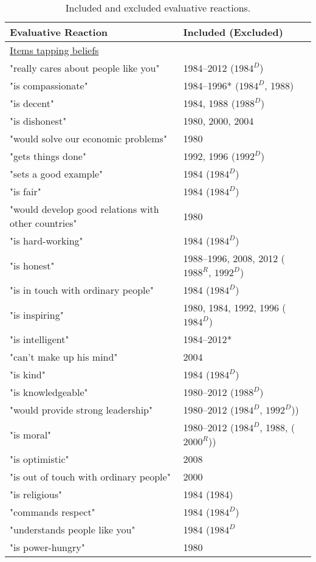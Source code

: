 \documentclass[10pt]{article}
\begin{document}
\begin{table}[t]
\begin{threeparttable}
    \caption{Included and excluded evaluative reactions.}
    \label{tab:tab2}
   \begin{tabular}{ll}
        \toprule
        Evaluative Reaction &	Included (Excluded)\\
        \midrule
        \multicolumn{2}{l}{\underline{Items tapping beliefs}}\\       
"really cares about people like you" &	1984--2012 ($1984^{D}$)\\
"is compassionate" &	1984--1996* ($1984^{D}$, 1988)\\
"is decent" &	1984, 1988 ($1988^{D}$)\\
"is dishonest" &	1980, 2000, 2004\\
"would solve our economic problems" &	1980\\
"gets things done" &	1992, 1996 ($1992^{D}$)\\
"sets a good example" &	1984 ($1984^{D}$)\\
"is fair" &	1984 ($1984^{D}$)\\
"would develop good relations with other countries" &	1980\\
"is hard-working" &	1984 ($1984^{D}$)\\
"is honest" &	1988--1996, 2008, 2012 ($1988^{R}$, $1992^{D}$)\\
"is in touch with ordinary people" & 	1984 ($1984^{D}$)\\
"is inspiring" &	1980, 1984, 1992, 1996 ($1984^{D}$)\\
"is intelligent" &	1984--2012*\\
"can't make up his mind" &	2004\\
"is kind" &	1984	 ($1984^{D}$)\\
"is knowledgeable" &	1980--2012 ($1988^{D}$)\\
"would provide strong leadership" &	1980--2012 ($1984^{D}$,  $1992^{D}$))\\
"is moral" &	1980--2012 ($1984^{D}$, 1988, ($2000^{R}$))\\
"is optimistic" &	2008\\
"is out of touch with ordinary people" &	2000 \\
"is religious" &	1984 (1984)\\
"commands respect" &	1984 ($1984^{D}$)\\
"understands people like you" &	1984 ($1984^{D}$\\
"is power-hungry" &	1980\\

\end{tabular}
\end{threeparttable}
\end{table}
\end{document}
